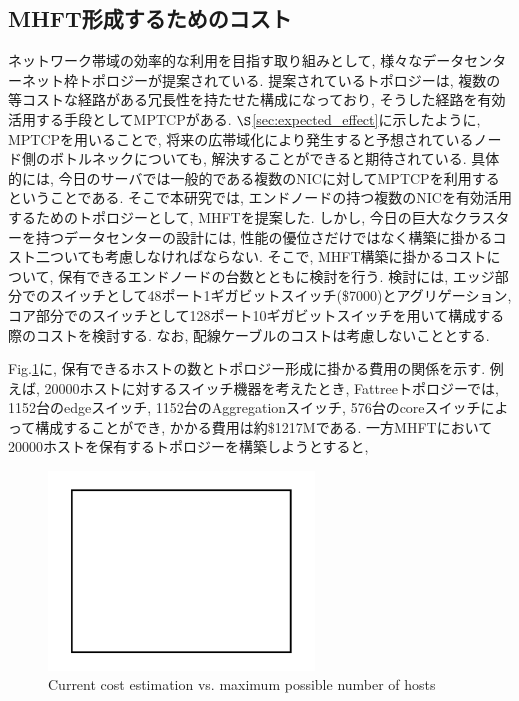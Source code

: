 \subsection{MHFT形成するためのコスト}
ネットワーク帯域の効率的な利用を目指す取り組みとして, 様々なデータセンターネット枠トポロジーが提案されている. 
提案されているトポロジーは, 複数の等コストな経路がある冗長性を持たせた構成になっており, そうした経路を有効活用する手段としてMPTCPがある. 
$\S$\ref{sec:expected_effect}に示したように, MPTCPを用いることで,
将来の広帯域化により発生すると予想されているノード側のボトルネックについても, 解決することができると期待されている. 
具体的には, 今日のサーバでは一般的である複数のNICに対してMPTCPを利用するということである. 
そこで本研究では, エンドノードの持つ複数のNICを有効活用するためのトポロジーとして, MHFTを提案した. 
しかし, 今日の巨大なクラスターを持つデータセンターの設計には, 性能の優位さだけではなく構築に掛かるコスト二ついても考慮しなければならない. 
そこで, MHFT構築に掛かるコストについて, 保有できるエンドノードの台数とともに検討を行う. 
検討には, エッジ部分でのスイッチとして48ポート1ギガビットスイッチ(\$7000)とアグリゲーション,
コア部分でのスイッチとして128ポート10ギガビットスイッチを用いて構成する際のコストを検討する\cite{fattree}.
なお, 配線ケーブルのコストは考慮しないこととする. 

Fig.\ref{fig:MHFT_cost}に, 保有できるホストの数とトポロジー形成に掛かる費用の関係を示す. 
例えば, 20000ホストに対するスイッチ機器を考えたとき, Fattreeトポロジーでは, 1152台のedgeスイッチ,
1152台のAggregationスイッチ, 576台のcoreスイッチによって構成することができ, かかる費用は約\$1217Mである. 
一方MHFTにおいて20000ホストを保有するトポロジーを構築しようとすると, 

\begin{figure}[t]
    \begin{center}
    \includegraphics[autoebb, width=200pt]{./img/test.pdf}
    \caption{Current cost estimation vs. maximum possible number of hosts}
    \label{fig:MHFT_cost}
    \end{center}
\end{figure}

